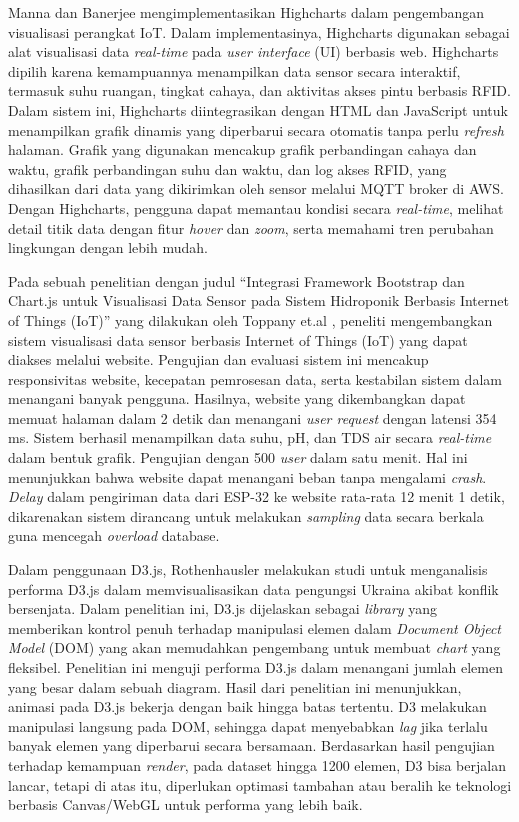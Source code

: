 Manna dan Banerjee \cite{Manna2024} mengimplementasikan Highcharts dalam pengembangan visualisasi perangkat IoT. Dalam implementasinya, Highcharts digunakan sebagai alat visualisasi data \textit{real-time} pada \textit{user interface} (UI) berbasis web. Highcharts dipilih karena kemampuannya menampilkan data sensor secara interaktif, termasuk suhu ruangan, tingkat cahaya, dan aktivitas akses pintu berbasis RFID. Dalam sistem ini, Highcharts diintegrasikan dengan HTML dan JavaScript untuk menampilkan grafik dinamis yang diperbarui secara otomatis tanpa perlu \textit{refresh} halaman. Grafik yang digunakan mencakup grafik perbandingan cahaya dan waktu, grafik perbandingan suhu dan waktu, dan log akses RFID, yang dihasilkan dari data yang dikirimkan oleh sensor melalui MQTT broker di AWS. Dengan Highcharts, pengguna dapat memantau kondisi secara \textit{real-time}, melihat detail titik data dengan fitur \textit{hover} dan \textit{zoom}, serta memahami tren perubahan lingkungan dengan lebih mudah.

Pada sebuah penelitian dengan judul “Integrasi Framework Bootstrap dan Chart.js untuk Visualisasi Data Sensor pada Sistem Hidroponik Berbasis Internet of Things (IoT)” yang dilakukan oleh Toppany et.al \cite{Toppany2023}, peneliti mengembangkan sistem visualisasi data sensor berbasis Internet of Things (IoT) yang dapat diakses melalui website. Pengujian dan evaluasi sistem ini mencakup responsivitas website, kecepatan pemrosesan data, serta kestabilan sistem dalam menangani banyak pengguna. Hasilnya, website yang dikembangkan dapat memuat halaman dalam 2 detik dan menangani \textit{user request} dengan latensi 354 ms. Sistem berhasil menampilkan data suhu, pH, dan TDS air secara \textit{real-time} dalam bentuk grafik. Pengujian dengan 500 \textit{user} dalam satu menit. Hal ini menunjukkan bahwa website dapat menangani beban tanpa mengalami \textit{crash}. \textit{Delay} dalam pengiriman data dari ESP-32 ke website rata-rata 12 menit 1 detik, dikarenakan sistem dirancang untuk melakukan \textit{sampling} data secara berkala guna mencegah \textit{overload} database. 

Dalam penggunaan D3.js, Rothenhausler \cite{Rothenhausler2022} melakukan studi untuk menganalisis performa D3.js dalam memvisualisasikan data pengungsi Ukraina akibat konflik bersenjata. Dalam penelitian ini, D3.js dijelaskan sebagai \textit{library} yang memberikan kontrol penuh terhadap manipulasi elemen dalam \textit{Document Object Model} (DOM) yang akan memudahkan pengembang untuk membuat \textit{chart} yang fleksibel. Penelitian ini menguji performa D3.js dalam menangani jumlah elemen yang besar dalam sebuah diagram. Hasil dari penelitian ini menunjukkan, animasi pada D3.js bekerja dengan baik hingga batas tertentu. D3 melakukan manipulasi langsung pada DOM, sehingga dapat menyebabkan \textit{lag} jika terlalu banyak elemen yang diperbarui secara bersamaan. Berdasarkan hasil pengujian terhadap kemampuan \textit{render}, pada dataset hingga 1200 elemen, D3 bisa berjalan lancar, tetapi di atas itu, diperlukan optimasi tambahan atau beralih ke teknologi berbasis Canvas/WebGL untuk performa yang lebih baik. 

